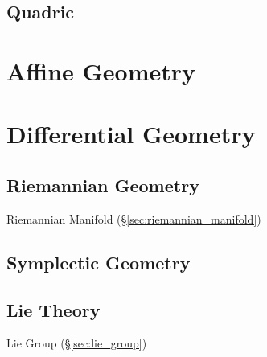 \subsection{Quadric}\label{sec:quadric}



\section{Affine Geometry}\label{sec:affine_geometry}

\section{Differential Geometry}\label{sec:differential_geometry}

\subsection{Riemannian Geometry}\label{sec:riemannian_geometry}

Riemannian Manifold (\S\ref{sec:riemannian_manifold})



\subsection{Symplectic Geometry}\label{sec:symplectic_geometry}

\subsection{Lie Theory}\label{sec:lie_theory}

Lie Group (\S\ref{sec:lie_group})

